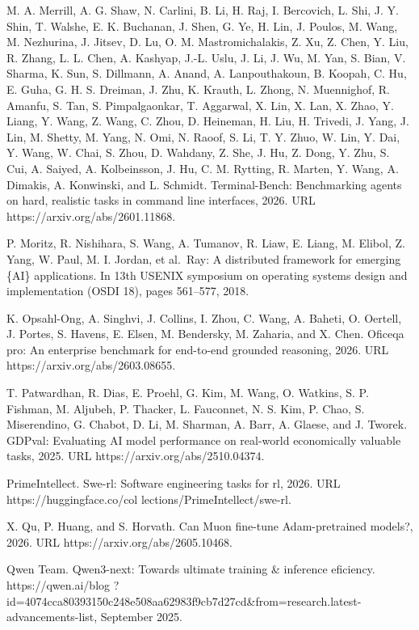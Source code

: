 \documentclass[
  10
]{article}
\begin{document}
M. A. Merrill, A. G. Shaw, N. Carlini, B. Li, H. Raj, I. Bercovich, L.
Shi, J. Y. Shin, T. Walshe, E. K. Buchanan, J. Shen, G. Ye, H. Lin, J.
Poulos, M. Wang, M. Nezhurina, J. Jitsev, D. Lu, O. M. Mastromichalakis,
Z. Xu, Z. Chen, Y. Liu, R. Zhang, L. L. Chen, A. Kashyap, J.-L. Uslu, J.
Li, J. Wu, M. Yan, S. Bian, V. Sharma, K. Sun, S. Dillmann, A. Anand, A.
Lanpouthakoun, B. Koopah, C. Hu, E. Guha, G. H. S. Dreiman, J. Zhu, K.
Krauth, L. Zhong, N. Muennighof, R. Amanfu, S. Tan, S. Pimpalgaonkar, T.
Aggarwal, X. Lin, X. Lan, X. Zhao, Y. Liang, Y. Wang, Z. Wang, C. Zhou,
D. Heineman, H. Liu, H. Trivedi, J. Yang, J. Lin, M. Shetty, M. Yang, N.
Omi, N. Raoof, S. Li, T. Y. Zhuo, W. Lin, Y. Dai, Y. Wang, W. Chai, S.
Zhou, D. Wahdany, Z. She, J. Hu, Z. Dong, Y. Zhu, S. Cui, A. Saiyed, A.
Kolbeinsson, J. Hu, C. M. Rytting, R. Marten, Y. Wang, A. Dimakis, A.
Konwinski, and L. Schmidt. Terminal-Bench: Benchmarking agents on hard,
realistic tasks in command line interfaces, 2026. URL
https://arxiv.org/abs/2601.11868.

P. Moritz, R. Nishihara, S. Wang, A. Tumanov, R. Liaw, E. Liang, M.
Elibol, Z. Yang, W. Paul, M. I. Jordan, et al.~Ray: A distributed
framework for emerging \{AI\} applications. In 13th USENIX symposium on
operating systems design and implementation (OSDI 18), pages 561--577,
2018.

K. Opsahl-Ong, A. Singhvi, J. Collins, I. Zhou, C. Wang, A. Baheti, O.
Oertell, J. Portes, S. Havens, E. Elsen, M. Bendersky, M. Zaharia, and
X. Chen. Oficeqa pro: An enterprise benchmark for end-to-end grounded
reasoning, 2026. URL https://arxiv.org/abs/2603.08655.

T. Patwardhan, R. Dias, E. Proehl, G. Kim, M. Wang, O. Watkins, S. P.
Fishman, M. Aljubeh, P. Thacker, L. Fauconnet, N. S. Kim, P. Chao, S.
Miserendino, G. Chabot, D. Li, M. Sharman, A. Barr, A. Glaese, and J.
Tworek. GDPval: Evaluating AI model performance on real-world
economically valuable tasks, 2025. URL https://arxiv.org/abs/2510.04374.

PrimeIntellect. Swe-rl: Software engineering tasks for rl, 2026. URL
https://huggingface.co/col lections/PrimeIntellect/swe-rl.

X. Qu, P. Huang, and S. Horvath. Can Muon fine-tune Adam-pretrained
models?, 2026. URL https://arxiv.org/abs/2605.10468.

Qwen Team. Qwen3-next: Towards ultimate training \& inference eficiency.
https://qwen.ai/blog
?id=4074cca80393150c248e508aa62983f9cb7d27cd\&from=research.latest-advancements-list,
September 2025.
\end{document}
